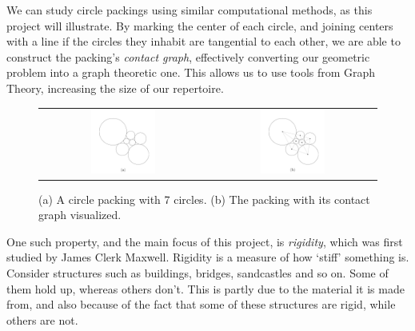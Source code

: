 \begin{flushleft}
We can study circle packings using similar computational methods, as this project will illustrate. By marking the center of each circle, and joining centers with a line if the circles they inhabit are tangential to each other, we are able to construct the packing's \textit{contact graph}, effectively converting our geometric problem into a graph theoretic one. This allows us to use tools from Graph Theory, increasing the size of our repertoire.    
\end{flushleft}

\begin{figure}[htbp]
    \centering
    \begin{tabular}{c c}
        \includegraphics[width = 0.4\textwidth]{Chapter 1/packing.png} & \includegraphics[width = 0.4\textwidth]{Chapter 1/packing_contact.png}   
    \end{tabular}
    \caption{(a) A circle packing with 7 circles. (b) The packing with its contact graph visualized.}
\end{figure}
\vspace{-2 mm}
\begin{flushleft}
One such property, and the main focus of this project, is \textit{rigidity}, which was first studied by James Clerk Maxwell. Rigidity is a measure of how `stiff' something is. Consider structures such as buildings, bridges, sandcastles and so on. Some of them hold up, whereas others don't. This is partly due to the material it is made from, and also because of the fact that some of these structures are rigid, while others are not.     
\end{flushleft}

